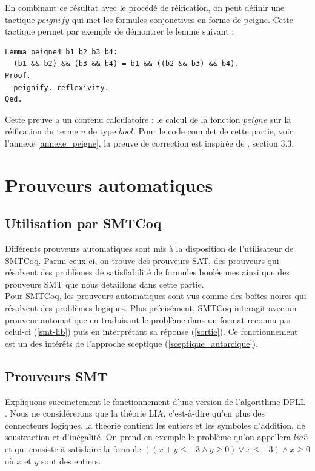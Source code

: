 \documentclass[11pt]{article}
\begin{document}
En combinant ce résultat avec le procédé de réification, on peut définir une tactique $peignify$ qui met les formules conjonctives en forme de peigne. Cette tactique permet par exemple de démontrer le lemme suivant : 

\begin{lstlisting}[frame=single]
Lemma peigne4 b1 b2 b3 b4:
  (b1 && b2) && (b3 && b4) = b1 && ((b2 && b3) && b4).
Proof.
  peignify. reflexivity.
Qed.
\end{lstlisting}
Cette preuve a un contenu calculatoire : le calcul de la fonction $peigne$ sur la réification du terme $u$ de type $bool$. Pour le code complet de cette partie, voir l'annexe \ref{annexe_peigne}, la preuve de correction est inspirée de \cite{coq_intro}, section 3.3.


\newpage
\section{Prouveurs automatiques} \label{fonctionnement_prouveurs}

\subsection{Utilisation par SMTCoq}

Différents prouveurs automatiques sont mis à la disposition de l'utilisateur de SMTCoq. Parmi ceux-ci, on trouve des prouveurs SAT, des prouveurs qui résolvent des problèmes de satisfiabilité de formules booléennes ainsi que des prouveurs SMT que nous détaillons dans cette partie. \\ 

Pour SMTCoq, les prouveurs automatiques sont vus comme des boîtes noires qui résolvent des problèmes logiques. Plus précisément, SMTCoq interagit avec un prouveur automatique en traduisant le problème dans un format reconnu par celui-ci (\ref{smt-lib}) puis en interprétant sa réponse (\ref{sortie}). Ce fonctionnement est un des intérêts de l'approche sceptique (\ref{sceptique_autarcique}).

\subsection{Prouveurs SMT} \label{smt}

Expliquons succinctement le fonctionnement d'une version de l'algorithme DPLL \cite{dpll}. Nous ne considérerons que la théorie LIA, c'est-à-dire qu'en plus des connecteurs logiques, la théorie contient les entiers et les symboles d'addition, de soustraction et d'inégalité. On prend en exemple le problème qu'on appellera $lia5$ et qui consiste à satisfaire la formule $((x + y \leq -3 \wedge y \geq 0) \vee x \leq -3) \wedge x \geq 0$ où $x$ et $y$ sont des entiers. \\
\end{document}
